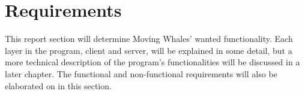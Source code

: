 \section{Requirements}

This report section will determine Moving Whales' wanted functionality. 
Each layer in the program, client and server,
will be explained in some detail, but a more technical description of 
the program's functionalities will be discussed in a later chapter. 
The functional and non-functional requirements will also be elaborated on in 
this section.



